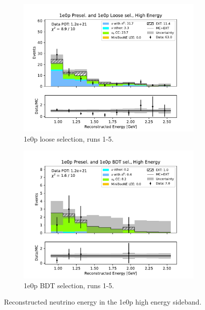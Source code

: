 \begin{figure}[H]
\begin{subfigure}{0.33\linewidth}
    \includegraphics[width=\linewidth]{technote/Sidebands/Figures/FarSideband/far_sideband_reco_e_run1234a4b4c4d5_ZP_ZPLOOSESEL_HIGH_ENERGY.pdf}
    \caption{1e0p loose selection, runs 1-5.}
    \end{subfigure}%
    \begin{subfigure}{0.33\linewidth}
    \includegraphics[width=\linewidth]{technote/Sidebands/Figures/FarSideband/far_sideband_reco_e_run1234a4b4c4d5_ZP_ZPBDT_HIGH_ENERGY.pdf}
    \caption{1e0p BDT selection, runs 1-5.}
    \end{subfigure}
    \caption{Reconstructed neutrino energy in the 1e0p high energy sideband.}
    \label{fig:HighEnergy1eNp_nonpi0_score}
\end{figure}

